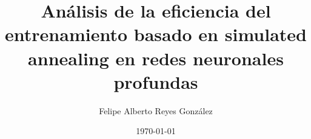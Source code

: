\documentclass[tesis]{tesis-usach}
\title{Análisis de la eficiencia del entrenamiento basado en simulated annealing en redes neuronales profundas}
\author{Felipe Alberto Reyes González}
\date{\today}
\begin{document}
	\renewcommand{\contentsname}{Tabla de contenidos}
	\renewcommand{\refname}{Referencias bibliográficas}
	\renewcommand{\tablename}{Tabla}
	\renewcommand{\appendixname}{Apéndice}
	\renewcommand{\BOthers}[1]{et al.\hbox{}}

	\maketitle
	\makecopyright
	\frontmatter
	\indice
	\mainmatter

	


	
	


\end{document}
